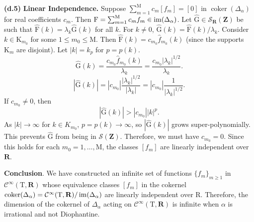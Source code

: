 \documentclass[10pt,letterpaper,reqno]{amsart}
\theoremstyle{article}
\newcommand{\1}{{\hat 1}}
\newcommand{\0}{{\hat 0}}
\newcommand{\RR}{\mathbf R}
\newcommand{\ZZ}{\mathbf Z}
\newcommand{\cS}{{\mathcal S}}
\def \F{\mathrm F}
\def \G{\mathrm G}
\def \K{\mathrm K}
\def \M{\mathrm M}
\def \R{\mathrm R}
\def \T{\mathrm T}
\newcommand{\coker}{\operatorname{coker}}
\newcommand{\Cinfty}{\mathcal{C}^\infty}
\newcommand{\im}{\operatorname{\rm im}}
\begin{document}
    \textbf{(d.5)} \textbf{Linear Independence.}
    Suppose $\sum_{m=1}^\M c_m [f_m] = [0]$ in $\coker(\Delta_\alpha)$ for real coefficients $c_m$.
    Then $\F = \sum_{m=1}^\M c_m f_m \in \im(\Delta_\alpha)$.
    Let $\hat{\G} \in \cS_{\RR}(\ZZ)$ be such that $\hat{\F}(k) = \lambda_k \hat{\G}(k)$ for all $k$.
    For $k \neq 0$,
    $\hat{\G}(k) = \hat{\F}(k) / \lambda_k$.
    Consider $k \in \K_{m_0}$ for some $1 \le m_0 \le \M$.
    Then $\hat{\F}(k) = c_{m_0} \hat{f}_{m_0}(k)$ (since the supports $\K_m$ are disjoint).
    Let $|k|=k_p$ for $p=p(k)$.
    $$
      \hat{\G}(k) = \frac{c_{m_0} \hat{f}_{m_0}(k)}{\lambda_k} = \frac{c_{m_0} |\lambda_k|^{1/2}}{\lambda_k}.
      $$
    $$ |\hat{\G}(k)| = |c_{m_0}| \frac{|\lambda_k|^{1/2}}{|\lambda_k|} = |c_{m_0}| \frac{1}{|\lambda_k|^{1/2}}.
      $$
    If $c_{m_0} \neq 0$,
    then
    $$
      |\hat{\G}(k)| > |c_{m_0}| |k|^p.
      $$
    As $|k| \to \infty$ for $k \in K_{m_0}$,
    $p=p(k) \to \infty$, so $|\hat{\G}(k)|$ grows super-polynomially.
    This prevents $\hat{\G}$ from being in $\cS(\ZZ)$.
    Therefore,
    we must have $c_{m_0} = 0$.
    Since this holds for each $m_0 = 1, \dots, \M$,
    the classes $[f_m]$ are linearly independent over $\RR$.
    
    \textbf{Conclusion}.
    We have constructed an infinite set of functions $\{f_m\}_{m\ge 1}$ in $\Cinfty(\T,\RR)$ whose equivalence classes $[f_m]$ in the cokernel $\coker(\Delta_\alpha) = \Cinfty(\T,\RR) / \im(\Delta_\alpha)$ are linearly independent over $\R$. Therefore, the dimension of the cokernel of $\Delta_\alpha$ acting on $\Cinfty(\T,\RR)$ is infinite when $\alpha$ is irrational and not Diophantine.

  
  
\end{document}
